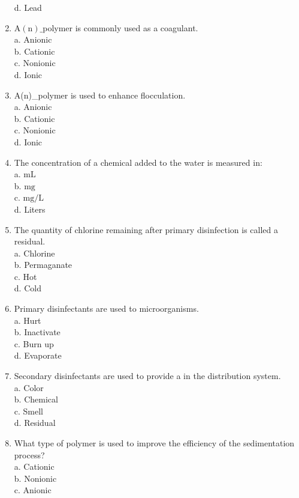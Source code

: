 \begin{enumerate}
d. Lead\\
\item $\mathrm{A}(\mathrm{n}) \_$polymer is commonly used as a coagulant.\\
a. Anionic\\
b. Cationic\\
c. Nonionic\\
d. Ionic\\
\item A(n)\_polymer is used to enhance flocculation.\\
a. Anionic\\
b. Cationic\\
c. Nonionic\\
d. Ionic\\
\item The concentration of a chemical added to the water is measured in:\\
a. $\mathrm{mL}$\\
b. $\mathrm{mg}$\\
c. $\mathrm{mg} / \mathrm{L}$\\
d. Liters\\
\item The quantity of chlorine remaining after primary disinfection is called a residual.\\
a. Chlorine\\
b. Permaganate\\
c. Hot\\
d. Cold\\
\item Primary disinfectants are used to microorganisms.\\
a. Hurt\\
b. Inactivate\\
c. Burn up\\
d. Evaporate\\
\item Secondary disinfectants are used to provide a in the distribution system.\\
a. Color\\
b. Chemical\\
c. Smell\\
d. Residual\\
\item What type of polymer is used to improve the efficiency of the sedimentation process?\\
a. Cationic\\
b. Nonionic\\
c. Anionic\\

\end{enumerate}

